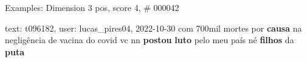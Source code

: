 \begin{frame}{Examples: Dimension 3 pos, score 4, \# 000042}
\footnotesize
\begin{exampleblock}{text: t096182, user: lucas\_pires04, 2022-10-30}
com 700mil mortes por \textbf{causa} na negligência de vacina do covid vc nn 
\textbf{postou} \textbf{luto} pelo meu país né \textbf{filhos} da \textbf{puta} 
\end{exampleblock}
\end{frame}
